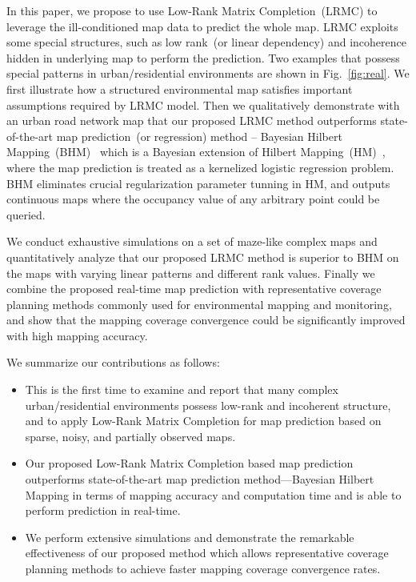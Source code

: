 In this paper, we propose to use Low-Rank Matrix Completion~(LRMC) to leverage the ill-conditioned map data to predict the whole map. LRMC exploits some special structures, such as low rank~(or linear dependency) and incoherence hidden in underlying map to perform the prediction. Two examples that possess special patterns in urban/residential environments are shown in Fig.~\ref{fig:real}.
We first illustrate how a structured environmental map satisfies important assumptions required by LRMC model. Then we qualitatively demonstrate with an urban road network map that our proposed LRMC method outperforms state-of-the-art map prediction~(or regression) method -- Bayesian Hilbert Mapping~(BHM)~\cite{senanayake2017bayesian} which is a Bayesian extension of Hilbert Mapping~(HM)~\cite{ramos2016hilbert}, where the map prediction is treated as a kernelized logistic regression problem. BHM eliminates crucial regularization parameter tunning in HM, and outputs continuous maps where the occupancy value of any arbitrary point could be queried.

We conduct exhaustive simulations on a set of maze-like complex maps and quantitatively analyze that our proposed LRMC method is superior to BHM on the maps with varying linear patterns and different rank values. 
Finally we combine the proposed real-time map prediction with representative coverage planning methods commonly used for environmental mapping and monitoring, and show that the mapping coverage convergence could be significantly improved with high mapping accuracy. 

We summarize our contributions as follows:
\begin{itemize}
    \item 
    This is the first time to examine and report that many complex urban/residential environments possess low-rank and incoherent structure, and to apply Low-Rank Matrix Completion for map prediction based on sparse, noisy, and partially observed maps.
    \item
    Our proposed Low-Rank Matrix Completion based map prediction outperforms state-of-the-art map prediction method---Bayesian Hilbert Mapping in terms of mapping accuracy and computation time and is able to perform prediction in real-time.
    \item
    We perform extensive simulations and demonstrate the remarkable effectiveness of our proposed method  which allows representative coverage planning methods to achieve faster mapping coverage convergence rates.  %
\end{itemize}
